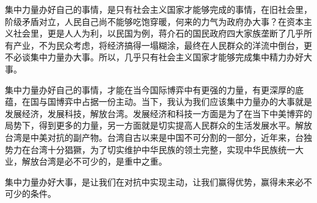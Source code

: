 \documentclass[12pt,a4paper]{article}
\begin{document}
集中力量办好自己的事情，是只有社会主义国家才能够完成的事情，在旧社会里，阶级矛盾对立，人民自己尚不能够吃饱穿暖，何来的力气为政府办大事？在资本主义社会里，更是人人为利，以民国为例，蒋介石的国民政府四大家族垄断了几乎所有产业，不为民众考虑，将经济搞得一塌糊涂，最终在人民群众的洋流中倒台，更不必谈集中力量办大事。所以，几乎只有社会主义国家才能够完成集中精力办好大事。

集中力量办好自己的事情，才能在当今国际博弈中有更强的力量，有更深厚的底蕴，在国与国博弈中占据一份主动。当下，我认为我们应该集中力量办的大事就是发展经济，发展科技，解放台湾。发展经济和科技一方面是为了在当下中美博弈的局势下，得到更多的力量，另一方面就是切实提高人民群众的生活发展水平。解放台湾是中美对抗的副产物。台湾自古以来是中国不可分割的一部分，近年来，台独势力在台湾十分猖獗，为了切实维护中华民族的领土完整，实现中华民族统一大业，解放台湾是必不可少的，是重中之重。

集中力量办好大事，是让我们在对抗中实现主动，让我们赢得优势，赢得未来必不可少的条件。
\end{document}
